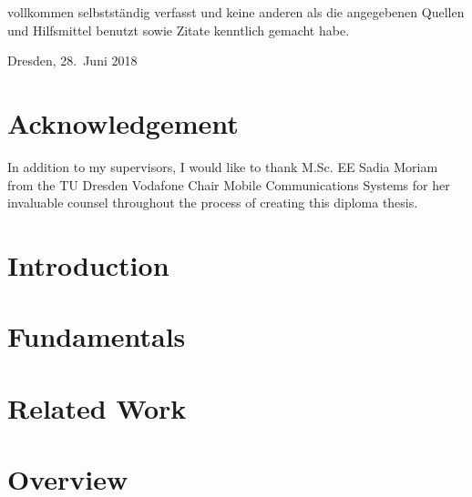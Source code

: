 \documentclass[
	paper=a4,
	fontsize=11pt,
	parskip=full %
]{scrreprt}
\begin{document}
    vollkommen selbstständig verfasst und keine anderen als die angegebenen Quellen und Hilfsmittel benutzt sowie Zitate kenntlich gemacht habe.

    \vspace{0.5\baselineskip}
    Dresden, 28.\ Juni 2018 \\

    \vspace{1.5\baselineskip}
    \theauthor

	\chapter*{Acknowledgement}
    In addition to my supervisors, I would like to thank M.Sc. EE Sadia Moriam from the TU Dresden Vodafone Chair Mobile Communications Systems for
    her invaluable counsel throughout the process of creating this diploma thesis.
	
    \begingroup
	\tableofcontents
	
	
    \let\clearpage\relax
	\listoftables
	\vspace{-2.6\baselineskip}
	\begingroup
	\let\clearpage\relax
	\listoffigures
	\endgroup

    \endgroup
	
	
	\chapter{Introduction}\label{ch:introduction}
    
    
    \chapter{Fundamentals}\label{ch:fundamentals}
    

    \chapter{Related Work}\label{ch:relatedwork}
    

    \chapter{Overview}\label{ch:overview}
    
\end{document}

